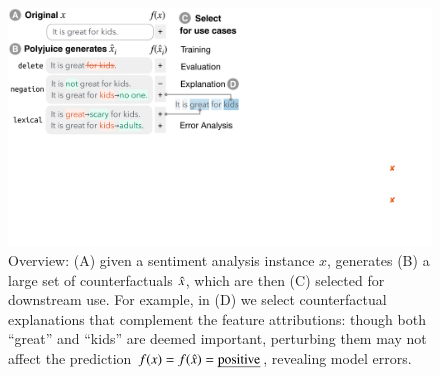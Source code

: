 \begin{figure}[t]
\centering
\includegraphics[trim={0 18cm 30.5cm 0cm},clip, width=1\columnwidth]{figures/teaser.pdf}
\vspace{-15pt}
\caption{
Overview: (A) given a sentiment analysis instance $x$, \sysname generates (B) a large set of counterfactuals $\hat{x}$, which are then (C) selected for downstream use.
For example, in (D) we select counterfactual explanations that complement the feature attributions: though both ``great'' and ``kids'' are deemed important, perturbing them may not affect the prediction $f(x)=f(\hat{x})=\text{\emph{positive}}$, revealing model errors.\footnotemark
}
\vspace{-10pt}
\label{fig:teaser}
\end{figure} 


